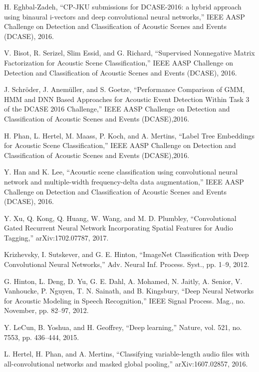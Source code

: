 \documentclass[conference]{IEEEtran}
\begin{document}
\begin{thebibliography}{00}
	H. Eghbal-Zadeh, ``CP-JKU submissions for DCASE-2016: a hybrid approach using binaural i-vectors and deep convolutional neural networks,'' IEEE AASP Challenge on Detection and Classification of Acoustic Scenes and Events (DCASE), 2016.

 V. Bisot, R. Serizel, Slim Essid, and G. Richard, ``Supervised Nonnegative Matrix Factorization for Acoustic Scene Classification,'' IEEE AASP Challenge on Detection and Classification of Acoustic Scenes and Events (DCASE), 2016.

 J. Schröder, J. Anemüller, and S. Goetze, ``Performance Comparison of GMM, HMM and DNN Based Approaches for Acoustic Event Detection Within Task 3 of the DCASE 2016 Challenge,'' IEEE AASP Challenge on Detection and Classification of Acoustic Scenes and Events (DCASE),2016.

 H. Phan, L. Hertel, M. Maass, P. Koch, and A. Mertins, ``Label Tree Embeddings for Acoustic Scene Classification,'' IEEE AASP Challenge on Detection and Classification of Acoustic Scenes and Events (DCASE),2016.

 Y. Han and K. Lee, ``Acoustic scene classification using convolutional neural network and multiple-width frequency-delta data augmentation,'' IEEE AASP Challenge on Detection and Classification of Acoustic Scenes and Events (DCASE), 2016.

 Y. Xu, Q. Kong, Q. Huang, W. Wang, and M. D. Plumbley, ``Convolutional Gated Recurrent Neural Network Incorporating Spatial Features for Audio Tagging,'' arXiv:1702.07787, 2017.

 Krizhevsky, I. Sutskever, and G. E. Hinton, ``ImageNet Classification with Deep Convolutional Neural Networks,'' Adv. Neural Inf. Process. Syst., pp. 1–9, 2012.

 G. Hinton, L. Deng, D. Yu, G. E. Dahl, A. Mohamed, N. Jaitly, A. Senior, V. Vanhoucke, P. Nguyen, T. N. Sainath, and B. Kingsbury, ``Deep Neural Networks for Acoustic Modeling in Speech Recognition,'' IEEE Signal Process. Mag., no. November, pp. 82–97, 2012.

 Y. LeCun, B. Yoshua, and H. Geoffrey, ``Deep learning,'' Nature, vol. 521, no. 7553, pp. 436–444, 2015.

 L. Hertel, H. Phan, and A. Mertins, ``Classifying variable-length audio files with all-convolutional networks and masked global pooling,'' arXiv:1607.02857, 2016.


\end{thebibliography}
\end{document}
